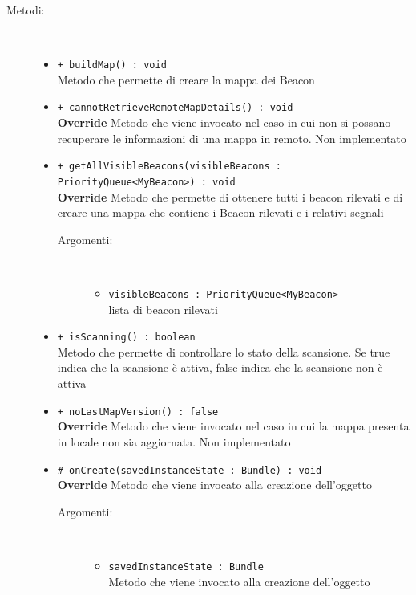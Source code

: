 \documentclass[../DefinizioneDiProdotto.tex]{subfiles}
\begin{document}
\begin{description}
\begin{itemize}
	\end{itemize}
	\item[Metodi:] \
	\begin{itemize}
		\item \texttt{+ buildMap() : void}\\
		Metodo che permette di creare la mappa dei Beacon
		\item \texttt{+ cannotRetrieveRemoteMapDetails() : void}\\
		\textbf{Override} Metodo che viene invocato nel caso in cui non si possano recuperare le informazioni di una mappa in remoto. Non implementato
		\item \texttt{+ getAllVisibleBeacons(visibleBeacons : PriorityQueue<MyBeacon>) : void}\\
		\textbf{Override} Metodo che permette di ottenere tutti i beacon rilevati e di creare una mappa che contiene i Beacon rilevati e i relativi segnali
		\begin{description}
			\item[Argomenti:] \
			\begin{itemize}
				\item \texttt{visibleBeacons : PriorityQueue<MyBeacon>}\\
				lista di beacon rilevati\end{itemize}
		\end{description}
		\item \texttt{+ isScanning() : boolean}\\
		Metodo che permette di controllare lo stato della scansione. Se true indica che la scansione è attiva, false indica che la scansione non è attiva
		\item \texttt{+ noLastMapVersion() : false}\\
		\textbf{Override} Metodo che viene invocato nel caso in cui la mappa presenta in locale non sia aggiornata. Non implementato
		\item \texttt{\# onCreate(savedInstanceState : Bundle) : void}\\
		\textbf{Override} Metodo che viene invocato alla creazione dell'oggetto
		\begin{description}
			\item[Argomenti:] \
			\begin{itemize}
				\item \texttt{savedInstanceState : Bundle}\\
				Metodo che viene invocato alla creazione dell'oggetto\end{itemize}
		\end{description}

\end{itemize}
\end{description}
\end{document}
